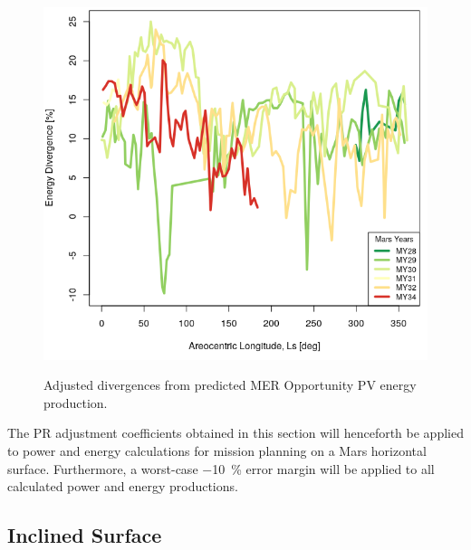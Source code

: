 \begin{figure}[H]
  \centering
  \hypersetup{linkcolor=captionTextColor}
  \includegraphics[width=0.8\linewidth]{sections/power-and-energy-predictions/plots/energy-prediction-divergences-adjusted.png}\\
  \caption[Adjusted divergences from predicted MER Opportunity PV energy production]
          {Adjusted divergences from predicted MER Opportunity PV energy production.}
  \label{fig:plot:mer-energy-prediction-divergences-adjusted}
\end{figure}

The PR adjustment coefficients obtained in this section will henceforth be applied to power and energy calculations for mission planning on a Mars horizontal surface. Furthermore, a worst-case \SI{-10}{\percent} error margin will be applied to all calculated power and energy productions.

\subsection{Inclined Surface}
\label{sec:PowerAndEnergyPredictions:Validation:InclinedSurface}

